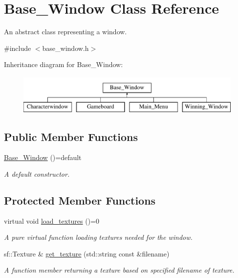 \hypertarget{classBase__Window}{}\section{Base\+\_\+\+Window Class Reference}
\label{classBase__Window}


An abstract class representing a window.  




{\ttfamily \#include $<$base\+\_\+window.\+h$>$}

Inheritance diagram for Base\+\_\+\+Window\+:\begin{figure}[H]
\begin{center}
\leavevmode
\includegraphics[height=2.000000cm]{classBase__Window}
\end{center}
\end{figure}
\subsection*{Public Member Functions}
\begin{DoxyCompactItemize}
\item 
\hyperlink{classBase__Window_a89fc36aacdebe0a28371648c16a51be6}{Base\+\_\+\+Window} ()=default
\begin{DoxyCompactList}\small\item\em A default constructor. \end{DoxyCompactList}\end{DoxyCompactItemize}
\subsection*{Protected Member Functions}
\begin{DoxyCompactItemize}
\item 
virtual void \hyperlink{classBase__Window_a0d0e107e9eb19bd74b25f4465688e862}{load\+\_\+textures} ()=0
\begin{DoxyCompactList}\small\item\em A pure virtual function loading textures needed for the window. \end{DoxyCompactList}\item 
sf\+::\+Texture \& \hyperlink{classBase__Window_a7795a731d3e0dba029219b0d81954dfc}{get\+\_\+texture} (std\+::string const \&filename)
\begin{DoxyCompactList}\small\item\em A function member returning a texture based on specified filename of texture. \end{DoxyCompactList}\end{DoxyCompactItemize}
